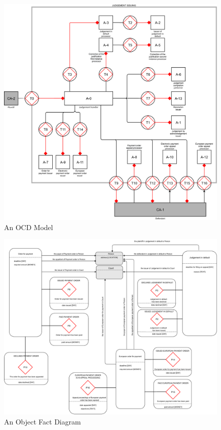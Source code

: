 \begin{figure}[h]\centering
	\includegraphics[width=\textwidth]{pic/ocd}
	\caption{An OCD Model}
	\label{fig:csdModel}
\end{figure}

\begin{figure}[h]\centering
	\includegraphics[width=\textwidth]{pic/ofd}
	\caption{An Object Fact Diagram}
	\label{fig:ofdModel}
\end{figure}

